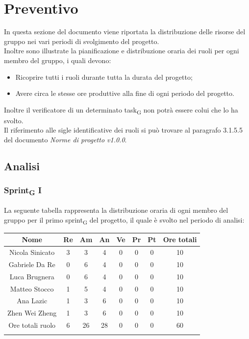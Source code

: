 \section{Preventivo}
In questa sezione del documento viene riportata la distribuzione delle risorse del gruppo nei vari periodi di svolgimento del progetto.\\
Inoltre sono illustrate la pianificazione e distribuzione oraria dei ruoli per ogni membro del gruppo, i quali devono:
\begin{itemize}
	\item Ricoprire tutti i ruoli durante tutta la durata del progetto;
	\item Avere circa le stesse ore produttive alla fine di ogni periodo del progetto.
\end{itemize}
Inoltre il verificatore di un determinato task\textsubscript{G} non potrà essere colui che lo ha svolto.\\
Il riferimento alle sigle identificative dei ruoli si può trovare al paragrafo 3.1.5.5 del documento \textit{Norme di progetto v1.0.0}.
\newpage
\subsection{Analisi}
%
\subsubsection{Sprint\textsubscript{G} I}
%
La seguente tabella rappresenta la distribuzione oraria di ogni membro del gruppo per il primo sprint\textsubscript{G} del progetto, il quale è svolto nel periodo di analisi:

	\setlength\extrarowheight{5pt}
	\begin{tabularx}{\textwidth}{|ccccccc|c|}
		\hline
		\rowcolor{white}
		\textbf{Nome} & \textbf{Re} & \textbf{Am} & \textbf{An} & \textbf{Ve} & \textbf{Pr}& \textbf{Pt} & \textbf{Ore totali} \\
		\hline
		Nicola Sinicato &3&3&4&0&0&0&10 \\
		Gabriele Da Re &0&6&4&0&0&0&10 \\
		Luca Brugnera &0&6&4&0&0&0&10 \\
		Matteo Stocco &1&5&4&0&0&0&10 \\
		Ana Lazic &1&3&6&0&0&0&10 \\
		Zhen Wei Zheng &1&3&6&0&0&0&10 \\
		\hline
		Ore totali ruolo &6&26&28&0&0&0&60 \\
		\hline
		\rowcolor{white}
		\caption{Distribuzione oraria durante il primo sprint\textsubscript{G} per ruolo e persona}
	\end{tabularx}
	\vspace{10pt}
	

